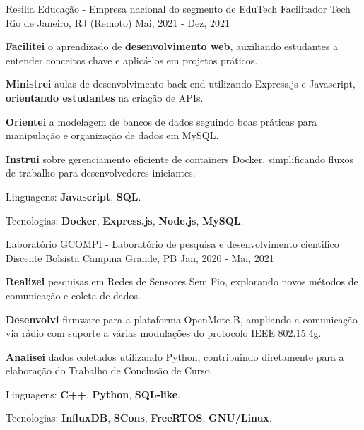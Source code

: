 \begin{cventries}
  \cventry
  {Resilia Educação - Empresa nacional do segmento de EduTech} %
  {Facilitador Tech} %
  {Rio de Janeiro, RJ (Remoto)} %
  {Mai, 2021 - Dez, 2021} %
  {
    \begin{cvitems}
      \item {\textbf{Facilitei} o aprendizado de \textbf{desenvolvimento web}, auxiliando estudantes a entender conceitos chave e aplicá-los em projetos práticos.}
      \item {\textbf{Ministrei} aulas de desenvolvimento back-end utilizando {Express.js} e {Javascript}, \textbf{orientando estudantes} na criação de APIs.}
      \item {\textbf{Orientei} a modelagem de bancos de dados seguindo boas práticas para manipulação e organização de dados em {MySQL}.}
      \item {\textbf{Instrui} sobre gerenciamento eficiente de containers {Docker}, simplificando fluxos de trabalho para desenvolvedores iniciantes.}
      \item {Linguagens: \textbf{Javascript}, \textbf{SQL}.}
      \item {Tecnologias: \textbf{Docker}, \textbf{Express.js}, \textbf{Node.js}, \textbf{MySQL}.}
    \end{cvitems}
  }

  \cventry
  {Laboratório GCOMPI - Laboratório de pesquisa e desenvolvimento cientifico} %
  {Discente Bolsista} %
  {Campina Grande, PB} %
  {Jan, 2020 - Mai, 2021} %
  {
    \begin{cvitems}
      \item {\textbf{Realizei} pesquisas em Redes de Sensores Sem Fio, explorando novos métodos de comunicação e coleta de dados.}
      \item {\textbf{Desenvolvi} firmware para a plataforma {OpenMote B}, ampliando a comunicação via rádio com suporte a várias modulações do protocolo {IEEE 802.15.4g}.}
      \item {\textbf{Analisei} dados coletados utilizando {Python}, contribuindo diretamente para a elaboração do Trabalho de Conclusão de Curso.}
      \item {Linguagens: \textbf{C++}, \textbf{Python}, \textbf{SQL-like}.}
      \item {Tecnologias: \textbf{InfluxDB}, \textbf{SCons}, \textbf{FreeRTOS}, \textbf{GNU/Linux}.}
    \end{cvitems}
  }
\end{cventries}
